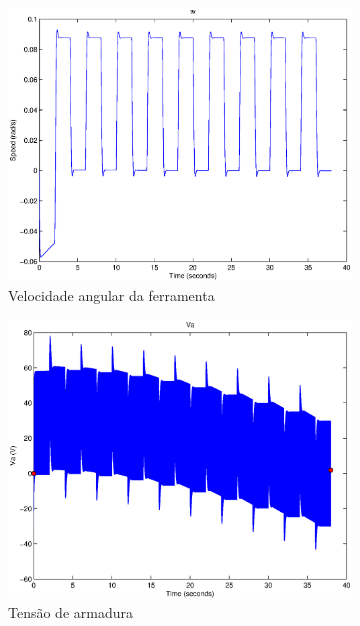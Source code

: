 \documentclass{article}
\begin{document}
\begin{figure}[H]
\begin{subfigure}{0.3\textwidth}
		\includegraphics[width=\linewidth]{matlab/w6}
		\caption{Velocidade angular da ferramenta}
	\end{subfigure}
	\begin{subfigure}{0.3\textwidth}
		\includegraphics[width=\linewidth]{matlab/va6}
		\caption{Tensão de armadura}
	\end{subfigure}
	\begin{subfigure}{0.3\textwidth}

\end{subfigure}
\end{figure}
\end{document}
